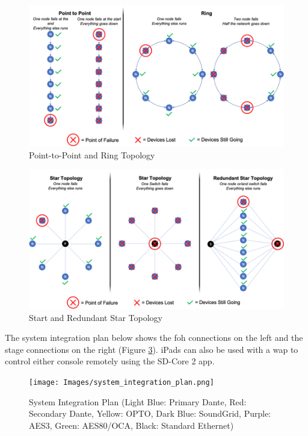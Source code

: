         \begin{figure}[H]
            \centering
            \includegraphics[width=1\linewidth]{Images/bad_topologies.png}
            \caption{Point-to-Point and Ring Topology}
            \label{fig:bad_topologies}
        \end{figure}

        \begin{figure}[H]
            \centering
            \includegraphics[width=1\linewidth]{Images/redundant_star_topology.png}
            \caption{Start and Redundant Star Topology}
            \label{fig:redundant_star_topology}
        \end{figure}
        
        The system integration plan below shows the \acrshort{foh} connections on the left and the stage connections on the right (Figure \ref{fig:system_integration_plan}). iPads can also be used with a \acrfull{wap} to control either console remotely using the SD-Core 2 app.
        
        \begin{figure}[H]
            \centering
            \texttt{[image: Images/system\_integration\_plan.png]}
            \caption{System Integration Plan (Light Blue: Primary Dante, Red: Secondary Dante, Yellow: OPTO, Dark Blue: SoundGrid, Purple: AES3, Green: AES80/OCA, Black: Standard Ethernet)}
            \label{fig:system_integration_plan}
        \end{figure}

